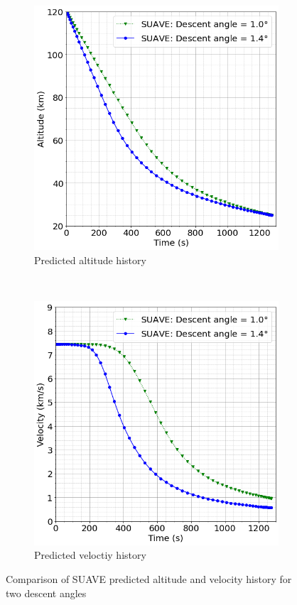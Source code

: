 \documentclass[%
 aip,
 amsmath,amssymb,
preprint,%
]{revtex4-1}
\begin{document}
\begin{figure}[ht]
\centering
\begin{subfigure}[b]{0.49\textwidth}
\centering
\includegraphics[width=\textwidth]{IXV_altitude_history_1976.png}
\caption{Predicted altitude history}
\label{suave_altitude_profile}
\end{subfigure}
~
\begin{subfigure}[b]{0.49\textwidth}
\centering
\includegraphics[width=\textwidth]{IXV_velocity_history_1976.png}
\caption{Predicted veloctiy history}
\label{suave_velocity_profile}
\end{subfigure}
\caption{Comparison of SUAVE predicted altitude and velocity history for two descent angles}
\end{figure}
\end{document}

